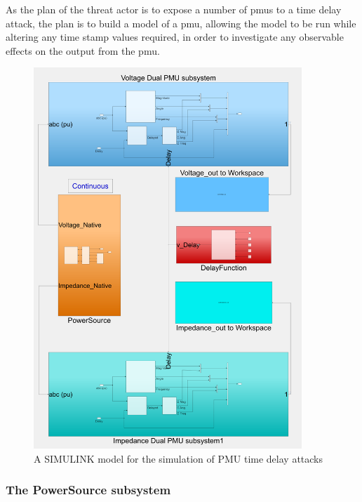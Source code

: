 As the plan of the threat actor is to expose  a number of \acrshort{pmu}s to a time  delay attack, the plan is to build a model of a \acrshort{pmu}, allowing the model to be run while altering any time stamp values required, in order to investigate any observable effects on the output from the \acrshort{pmu}.
 \begin{figure}[ht]
\centering
\includegraphics[width=0.9\textwidth]{figures/pmuSIM-overview.png}
\caption[PmuSIM SIMULINK model]{A SIMULINK model for the simulation of PMU time delay attacks}

\end{figure}


\subsubsection{The PowerSource subsystem}

